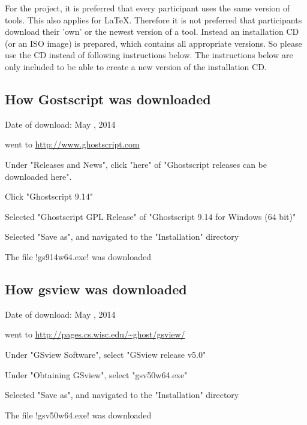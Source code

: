 For the project, it is preferred that every participant uses the same version
of tools. This also applies for LaTeX. Therefore it is not preferred that
participants download their 'own' or the newest version of a tool. Instead an
installation CD (or an ISO image) is prepared, which contains all appropriate
versions. So please use the CD instead of following instructions below. The
instructions below are only included to be able to create a new version of the
installation CD.

\subsection{How Gostscript was downloaded}

\begin{itemize*}
\item Date of download: May , 2014
\end{itemize*}
\begin{enumerate*}
\item went to \url{http://www.ghostscript.com}
\item Under "Releases and News", click "here" of "Ghostscript releases can be
      downloaded here".
\item Click "Ghostscript 9.14"
\item Selected "Ghostscript GPL Release" of "Ghostscript 9.14 for Windows
      (64 bit)"
\item Selected "Save as", and navigated to the "Installation" directory
\item The file !gs914w64.exe! was downloaded
\end{enumerate*}

\subsection{How gsview was downloaded}

\begin{itemize*}
\item Date of download: May , 2014
\end{itemize*}
\begin{enumerate*}
\item went to \url{http://pages.cs.wisc.edu/~ghost/gsview/}
\item Under "GSview Software", select "GSview release v5.0"
\item Under "Obtaining GSview", select "gsv50w64.exe"
\item Selected "Save as", and navigated to the "Installation" directory
\item The file !gsv50w64.exe! was downloaded
\end{enumerate*}

